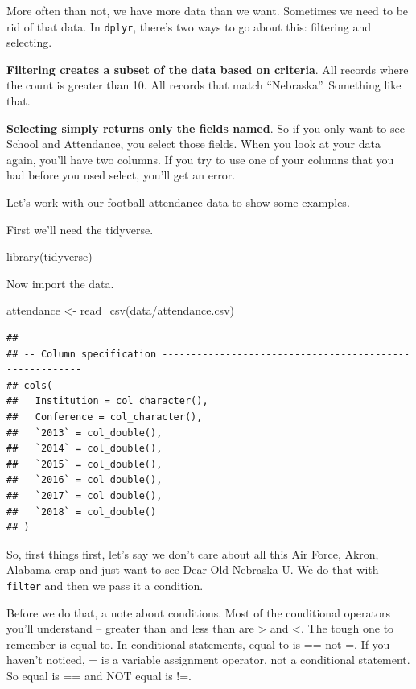 \documentclass[
]{book}
\newenvironment{Shaded}{\begin{snugshade}}{\end{snugshade}}
\newcommand{\FunctionTok}[1]{\textcolor[rgb]{0.00,0.00,0.00}{#1}}
\newcommand{\NormalTok}[1]{#1}
\newcommand{\OtherTok}[1]{\textcolor[rgb]{0.56,0.35,0.01}{#1}}
\newcommand{\StringTok}[1]{\textcolor[rgb]{0.31,0.60,0.02}{#1}}
\begin{document}
More often than not, we have more data than we want. Sometimes we need to be rid of that data. In \texttt{dplyr}, there's two ways to go about this: filtering and selecting.

\textbf{Filtering creates a subset of the data based on criteria}. All records where the count is greater than 10. All records that match ``Nebraska''. Something like that.

\textbf{Selecting simply returns only the fields named}. So if you only want to see School and Attendance, you select those fields. When you look at your data again, you'll have two columns. If you try to use one of your columns that you had before you used select, you'll get an error.

Let's work with our football attendance data to show some examples.

First we'll need the tidyverse.

\begin{Shaded}
\begin{Highlighting}[]
\FunctionTok{library}\NormalTok{(tidyverse)}
\end{Highlighting}
\end{Shaded}

Now import the data.

\begin{Shaded}
\begin{Highlighting}[]
\NormalTok{attendance }\OtherTok{\textless{}{-}} \FunctionTok{read\_csv}\NormalTok{(}\StringTok{\textquotesingle{}data/attendance.csv\textquotesingle{}}\NormalTok{)}
\end{Highlighting}
\end{Shaded}

\begin{verbatim}
## 
## -- Column specification --------------------------------------------------------
## cols(
##   Institution = col_character(),
##   Conference = col_character(),
##   `2013` = col_double(),
##   `2014` = col_double(),
##   `2015` = col_double(),
##   `2016` = col_double(),
##   `2017` = col_double(),
##   `2018` = col_double()
## )
\end{verbatim}

So, first things first, let's say we don't care about all this Air Force, Akron, Alabama crap and just want to see Dear Old Nebraska U. We do that with \texttt{filter} and then we pass it a condition.

Before we do that, a note about conditions. Most of the conditional operators you'll understand -- greater than and less than are \textgreater{} and \textless. The tough one to remember is equal to. In conditional statements, equal to is == not =. If you haven't noticed, = is a variable assignment operator, not a conditional statement. So equal is == and NOT equal is !=.
\end{document}
